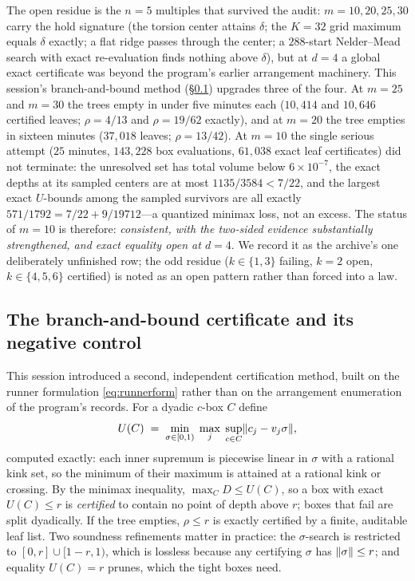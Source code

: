 The open residue is the $n=5$ multiples that survived the audit:
$m=10,20,25,30$ carry the hold signature (the torsion center attains
$\delta$; the $K=32$ grid maximum equals $\delta$ exactly; a flat ridge
passes through the center; a $288$-start Nelder--Mead search with exact
re-evaluation finds nothing above $\delta$), but at $d=4$ a global exact
certificate was beyond the program's earlier arrangement machinery.
This session's branch-and-bound method (\S\ref{sec:bb}) upgrades three
of the four. At $m=25$ and $m=30$ the trees empty in under five minutes
each ($10{,}414$ and $10{,}646$ certified leaves; $\rho=4/13$ and
$\rho=19/62$ exactly), and at $m=20$ the tree empties in sixteen
minutes ($37{,}018$ leaves; $\rho=13/42$). At $m=10$ the single
serious attempt ($25$ minutes, $143{,}228$ box evaluations, $61{,}038$
exact leaf certificates) did not terminate: the unresolved set has
total volume below $6\times10^{-7}$, the exact depths at its sampled
centers are at most $1135/3584<7/22$, and the largest exact $U$-bounds
among the sampled survivors are all exactly
$571/1792=7/22+9/19712$---a quantized minimax loss, not an excess. The
status of $m=10$ is therefore: \emph{consistent, with the two-sided
evidence substantially strengthened, and exact equality open at $d=4$}.
We record it as the archive's one deliberately unfinished row; the odd
residue ($k\in\{1,3\}$ failing, $k=2$ open, $k\in\{4,5,6\}$
certified) is noted as an open pattern rather than forced into a law.

\subsection{The branch-and-bound certificate and its negative control}
\label{sec:bb}

This session introduced a second, independent certification method,
built on the runner formulation \eqref{eq:runnerform} rather than on
the arrangement enumeration of the program's records. For a dyadic
$c$-box $C$ define
\[
U(C)\;=\;\min_{\sigma\in[0,1)}\;\max_j\;\sup_{c\in C}\lVert c_j-v_j\sigma \rVert,
\]
computed exactly: each inner supremum is piecewise linear in $\sigma$
with a rational kink set, so the minimum of their maximum is attained at
a rational kink or crossing. By the minimax inequality,
$\max_C D\le U(C)$, so a box with exact $U(C)\le r$ is \emph{certified}
to contain no point of depth above $r$; boxes that fail are split
dyadically. If the tree empties, $\rho\le r$ is exactly certified by a
finite, auditable leaf list. Two soundness refinements matter in
practice: the $\sigma$-search is restricted to
$[0,r]\cup[1-r,1)$, which is lossless because any certifying $\sigma$
has $\lVert \sigma \rVert\le r$; and equality $U(C)=r$ prunes, which the tight
boxes need.

